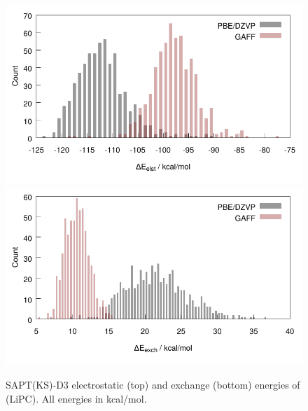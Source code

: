 \begin{figure}
 \begin{center}
 \includegraphics[width=0.9\linewidth]{images/ecpc/lipc_elst.pdf} \\
 \includegraphics[width=0.9\linewidth]{images/ecpc/lipc_exch.pdf}
 \end{center} 
 \caption[SAPT(KS)-D3 electrostatic and exchange energies of (LiPC)\sur{+}]{\label{fig:pcsapt1}SAPT(KS)-D3 electrostatic (top) and exchange (bottom)
 energies of (LiPC)\sur{+}. All energies in kcal/mol.}
\end{figure}

